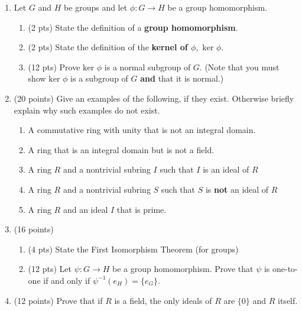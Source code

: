\documentclass[12pt]{article}
\renewcommand{\emph}[1]{\textsf{\textbf{#1}}}
\begin{document}
\newpage
\begin{enumerate}
\item Let $G$ and $H$ be groups and let $\phi: G \to H$ be a group homomorphism.
	\begin{enumerate}
	\item (2 pts) State the definition of a \emph{group homomorphism}.
	\vfill
	\item (2 pts) State the definition of the \emph{kernel of $\phi,$} $\text{ker } \phi.$ 
	\vfill
	\item (12 pts) Prove $\text{ker }\phi$ is a normal subgroup of $G.$ (Note that you must show $\text{ker }\phi$ is a subgroup of $G$ \emph{and} that it is normal.)
	\vspace{6.5in}
	\end{enumerate}
\newpage
\item (20 points) Give an examples of the following, if they exist. Otherwise briefly explain why such examples do not exist.
	\begin{enumerate}
	\item A commutative ring with unity that is not an integral domain.
	\vfill
	\item A ring that is an integral domain but is not a field.
	\vfill
	\item A ring $R$ and a nontrivial subring $I$ such that $I$ is an ideal of $R$
	\vfill
	\item A ring $R$ and a nontrivial subring $S$ such that $S$ is \emph{not} an ideal of $R$
	\vfill
	\item A ring $R$ and an ideal $I$ that is prime.
	\vfill
	\end{enumerate}
\newpage

\item (16 points) 
	\begin{enumerate}
	\item (4 pts) State the First Isomorphism Theorem (for groups)
	\vspace{2in}
	\item (12 pts) Let $\psi: G \to H$ be a group homomorphism. Prove that $\psi$ is one-to-one if and only if $\psi^{-1}(e_H)=\{e_G\}.$\\	
	\end{enumerate}
\newpage

\item (12 points) Prove that if $R$ is a field, the only ideals of $R$ are $\{0\}$ and $R$ itself.\\
\vfill


\end{enumerate}
\end{document}
